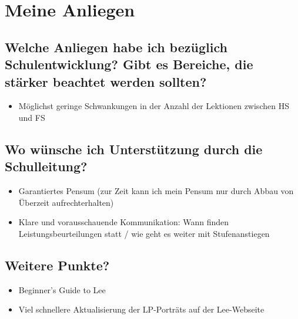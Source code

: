 \clearpage
\section{Meine Anliegen}
\subsection{Welche Anliegen habe ich bezüglich Schulentwicklung? Gibt es Bereiche, die
	stärker beachtet werden sollten?}
\begin{itemize}
	\item Möglichst geringe Schwankungen in der Anzahl der Lektionen zwischen HS und FS
\end{itemize}

\subsection{Wo wünsche ich Unterstützung durch die Schulleitung?}
\begin{itemize}
	\item Garantiertes Pensum (zur Zeit kann ich mein Pensum nur durch Abbau von Überzeit aufrechterhalten)
	\item Klare und vorausschauende Kommunikation: Wann finden Leistungsbeurteilungen statt / wie geht es weiter mit Stufenanstiegen
\end{itemize}

\subsection{Weitere Punkte?}
\begin{itemize}
	\item Beginner's Guide to Lee
	\item Viel schnellere Aktualisierung der LP-Porträts auf der Lee-Webseite
\end{itemize}